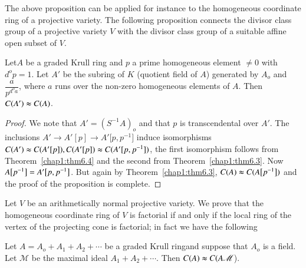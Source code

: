 The above proposition can be applied for instance to the homogeneous
coordinate ring of a projective variety. The following proposition
connects the divisor class group of a projective variety $V$ with
the  divisor class group of a suitable affine open subset of $V$. 

\setcounter{prop}{2}
\begin{prop}\label{chap1:prop7.3} %
Let\pageoriginale $A$ be a graded Krull ring and $p$ a prime homogeneous
   element $\neq 0$ with $d^o p = 1$. Let $A'$ be the subring of $K$
   (quotient field of $A$) generated by $A_o$ and $\dfrac{a}{p^{d^oa}
     }$, where $a$ runs over the non-zero homogeneous elements of
   $A$. Then $C(A') \thickapprox C(A)$. 
\end{prop}  
  
\begin{proof}
We note that $A' = (S^{-1} A)_o$ and that $p$ is transcendental
over $A'$. The inclusions $A' \rightarrow A'[p] \rightarrow A' \big[p,
  p^{-1}\big]$ induce isomorphisms $C(A') \thickapprox C(A' [p]), C(A'
[p]) \thickapprox C(A' [p, p^{-1}])$, the first isomorphism follows
from Theorem~\ref{chap1:thm6.4} and the second from 
Theorem~\ref{chap1:thm6.3}. Now $A 
\big[p^{-1}\big] = A' \big[p,\break p^{-1}\big]$. But again by 
Theorem~\ref{chap1:thm6.3}, $C(A) \thickapprox C(A \big[p^{-1} \big])$ and the
proof of the proposition is complete. 
\end{proof}  
  
  Let $V$ be an arithmetically normal projective variety. We prove
  that the homogeneous coordinate ring of $V$ is factorial if and only
  if the local ring of the vertex of the projecting cone is factorial;
  in fact we have the following 
  

\begin{prop}%
Let $A = A_o + A_1 +A_2 + \cdots$ be a graded Krull ring\break and
  suppose that $A_o$ is a field. Let $\mathscr{M}$ be the maximal
  ideal $A_1 + A_2  + \cdots$. Then $C(A) \thickapprox C(A
  \mathscr{M}$). 
\end{prop} 
   
